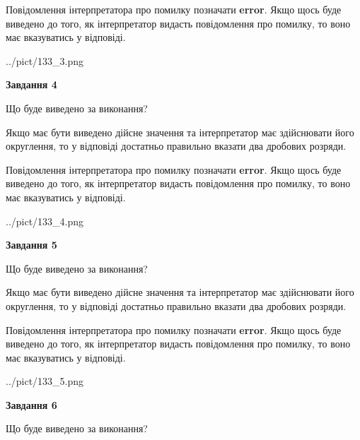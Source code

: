 \documentclass[12pt, ukrainian]{article}
\begin{document}
{\begin {Large}
Повідомлення інтерпретатора про помилку позначати \textbf{error}.
Якщо щось буде виведено до того, як інтерпретатор видасть повідомлення про помилку, 
то воно має вказуватись у відповіді. \par

\begin{center}
	{../pict/133_3.png}
\end{center}
\newpage

{\begin {center}\textbf{Завдання 4}\end {center}}\par
Що буде виведено за виконання? \par

Якщо має бути виведено дійсне значення та інтерпретатор має здійснювати його округлення, 
то у відповіді достатньо правильно вказати два дробових розряди.

Повідомлення інтерпретатора про помилку позначати \textbf{error}.
Якщо щось буде виведено до того, як інтерпретатор видасть повідомлення про помилку, 
то воно має вказуватись у відповіді. \par

\begin{center}
	{../pict/133_4.png}
\end{center}
\newpage

{\begin {center}\textbf{Завдання 5}\end {center}}\par
Що буде виведено за виконання? \par

Якщо має бути виведено дійсне значення та інтерпретатор має здійснювати його округлення, 
то у відповіді достатньо правильно вказати два дробових розряди.

Повідомлення інтерпретатора про помилку позначати \textbf{error}.
Якщо щось буде виведено до того, як інтерпретатор видасть повідомлення про помилку, 
то воно має вказуватись у відповіді. \par

\begin{center}
	{../pict/133_5.png}
\end{center}
\newpage

{\begin {center}\textbf{Завдання 6}\end {center}}\par
Що буде виведено за виконання? \par


\end{Large}}
\end{document}
